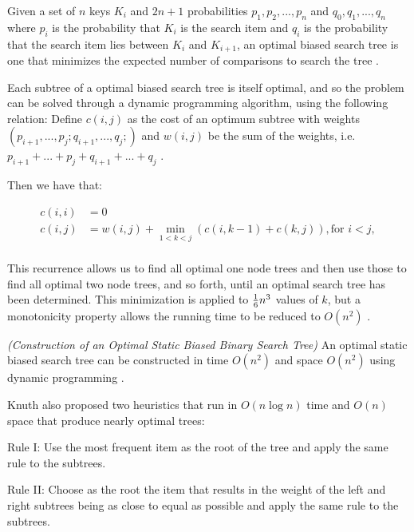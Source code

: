 \documentclass[mcs]{scsthesis}
\begin{document}
Given a set of $n$ keys \(K_i\) and \(2n + 1\) probabilities
\(p_1, p_2, ..., p_n\) and \(q_0, q_1, ..., q_n\) where \(p_i\) is the
probability that \(K_i\) is the search item and \(q_i\) is the
probability that the search item lies between \(K_i\) and \(K_{i+1}\), an
optimal biased search tree is one that minimizes the expected number of
comparisons to search the tree \cite{knuth}.

Each subtree of a optimal biased search tree is itself optimal, and so the
problem can be solved through a dynamic programming algorithm, using the
following relation: Define \( c(i,j)\) as the cost of an optimum subtree with
weights \((p_{i+1}, ..., p_j; q_{i+1}, ..., q_j;)\) and \(w(i, j)\) be the
sum of the weights, i.e. \(p_{i+1} + ... + p_j + q_{i + 1} + ... + q_j \)
\cite{knuth}.

Then we have that:

\begin{equation}
    \begin{aligned}
    c(i, i) & = 0 \\
    c(i, j) & = w(i, j) + \min_{1<k<j} (c(i, k - 1) + c(k, j)), \text{for } i<j, \\
    \end{aligned}
\end{equation}

This recurrence allows us to find all optimal one node trees and then use those
to find all optimal two node trees, and so forth, until an optimal search
tree has been determined. This minimization is applied to \({1\over{6}} n^{3} \)
values of \( k \), but a monotonicity property allows the running time to be
reduced to \( O(n^2) \) \cite{knuth}.

\begin{thm} \emph{(Construction of an Optimal Static Biased Binary Search Tree)} 
An optimal static biased search tree can be constructed in time \(O(n^2)\) and
space \(O(n^2)\) using dynamic programming \cite{knuth}.
\end{thm}

Knuth also proposed two heuristics that run in \(O(n \log n)\) time and
\(O(n)\) space that produce nearly optimal trees:

Rule I: Use the most frequent item as the root of the tree and apply the same
rule to the subtrees.

Rule II: Choose as the root the item that results in the weight of the left
and right subtrees being as close to equal as possible and apply the same
rule to the subtrees. 
\end{document}
